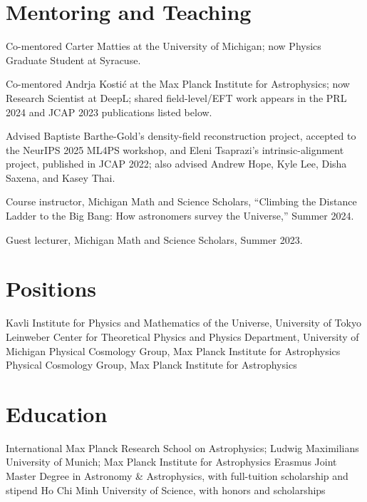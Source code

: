 \section*{Mentoring and Teaching}
\begin{tightitemize}
  \item Co-mentored Carter Matties at the University of Michigan; now Physics Graduate Student at Syracuse.
  \item Co-mentored Andrja Kosti\'c at the Max Planck Institute for Astrophysics; now Research Scientist at DeepL; shared field-level/EFT work appears in the PRL 2024 and JCAP 2023 publications listed below.
  \item Advised Baptiste Barthe-Gold's density-field reconstruction project, accepted to the NeurIPS 2025 ML4PS workshop, and Eleni Tsaprazi's intrinsic-alignment project, published in JCAP 2022; also advised Andrew Hope, Kyle Lee, Disha Saxena, and Kasey Thai.
  \item Course instructor, Michigan Math and Science Scholars, ``Climbing the Distance Ladder to the Big Bang: How astronomers survey the Universe,'' Summer 2024.
  \item Guest lecturer, Michigan Math and Science Scholars, Summer 2023.
\end{tightitemize}

\section*{Positions}
  {Kavli Institute for Physics and Mathematics of the Universe, University of Tokyo}{}
  {Leinweber Center for Theoretical Physics and Physics Department, University of Michigan}{}
  {Physical Cosmology Group, Max Planck Institute for Astrophysics}{}
  {Physical Cosmology Group, Max Planck Institute for Astrophysics}{}

\section*{Education}
  {International Max Planck Research School on Astrophysics; Ludwig Maximilians University of Munich; Max Planck Institute for Astrophysics}{}
  {Erasmus Joint Master Degree in Astronomy \& Astrophysics, with full-tuition scholarship and stipend}{}
  {Ho Chi Minh University of Science, with honors and scholarships}{}

